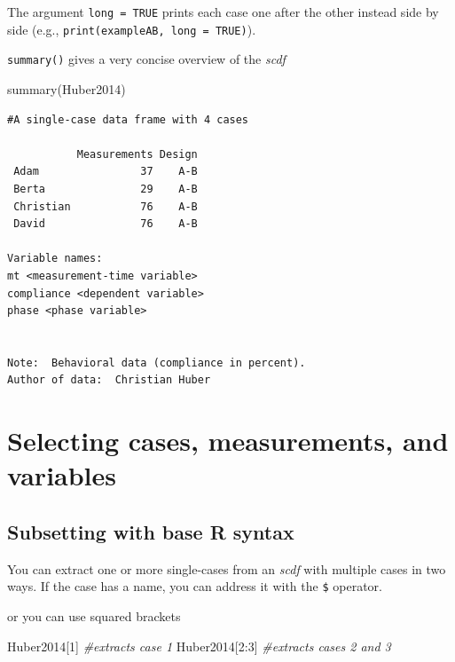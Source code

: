 \documentclass[
]{book}
\newenvironment{Shaded}{\begin{snugshade}}{\end{snugshade}}
\newcommand{\CommentTok}[1]{\textcolor[rgb]{0.56,0.35,0.01}{\textit{#1}}}
\newcommand{\DecValTok}[1]{\textcolor[rgb]{0.00,0.00,0.81}{#1}}
\newcommand{\FunctionTok}[1]{\textcolor[rgb]{0.00,0.00,0.00}{#1}}
\newcommand{\NormalTok}[1]{#1}
\newcommand{\SpecialCharTok}[1]{\textcolor[rgb]{0.00,0.00,0.00}{#1}}
\begin{document}
The argument \texttt{long\ =\ TRUE} prints each case one after the other instead side by side (e.g., \texttt{print(exampleAB,\ long\ =\ TRUE)}).

\texttt{summary()} gives a very concise overview of the \emph{scdf}

\begin{Shaded}
\begin{Highlighting}[]
\FunctionTok{summary}\NormalTok{(Huber2014)}
\end{Highlighting}
\end{Shaded}

\begin{verbatim}
#A single-case data frame with 4 cases

           Measurements Design
 Adam                37    A-B
 Berta               29    A-B
 Christian           76    A-B
 David               76    A-B

Variable names:
mt <measurement-time variable>
compliance <dependent variable>
phase <phase variable>


Note:  Behavioral data (compliance in percent).
Author of data:  Christian Huber 
\end{verbatim}

\hypertarget{selecting-cases-measurements-and-variables}{%
\section{Selecting cases, measurements, and variables}\label{selecting-cases-measurements-and-variables}}

\hypertarget{subsetting-with-base-r-syntax}{%
\subsection{Subsetting with base R syntax}\label{subsetting-with-base-r-syntax}}

You can extract one or more single-cases from an \emph{scdf} with multiple cases in two ways. If the case has a name, you can address it with the \texttt{\$} operator.

\begin{Shaded}
\end{Shaded}

or you can use squared brackets

\begin{Shaded}
\begin{Highlighting}[]
\NormalTok{Huber2014[}\DecValTok{1}\NormalTok{] }\CommentTok{\#extracts case 1}
\NormalTok{Huber2014[}\DecValTok{2}\SpecialCharTok{:}\DecValTok{3}\NormalTok{] }\CommentTok{\#extracts cases 2 and 3}
\end{Highlighting}
\end{Shaded}
\end{document}
